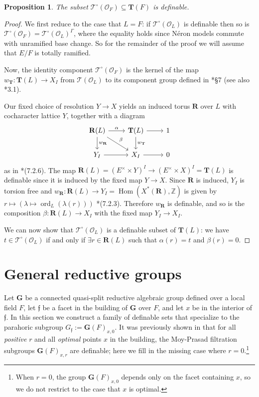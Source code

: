 \documentclass{amsart}
\newcommand{\Z}{{\mathbb Z}}
\newcommand{\ri}{\mathcal{O}}
\DeclareMathOperator{\ord}{ord}
\DeclareMathOperator{\Hom}{Hom}
\newcommand{\bG}{\mathbf{G}}
\newcommand{\bT}{\mathbf {T}}
\newcommand{\bR}{\mathbf{R}}
\newcommand{\ff}{{\mathfrak f}}
\newcommand{\Ner}[1]{\mathcal{#1}}
\newcommand{\NerC}[1]{\mathcal{#1}^\circ}
\theoremstyle{plain}
\newtheorem{prop}[thm]{Proposition}
\theoremstyle{definition}
\begin{document}
\begin{prop} \label{prop:NerCdefinable}
The subset $\NerC{T}(\ri_F) \subseteq \bT(F)$ is definable.
\end{prop}
\begin{proof}
We first reduce to the case that $L = F$: if $\NerC{T}(\ri_L)$ is definable then so is
$\NerC{T}(\ri_F) = \NerC{T}(\ri_L)^\Gamma$, where the equality holds since N\'eron models commute with unramified base change.
So for the remainder of the proof we will assume that $E/F$ is totally ramified.

Now, the identity component $\NerC{T}(\ri_F)$ is the kernel of the map $w_\bT : \bT(L) \to X_I$ from
$\Ner{T}(\ri_L)$ to its component group  defined in \cite{kottwitz:isocrystals-2}*{\S 7} (see also \cite{bitan}*{3.1}).

Our fixed choice of resolution $Y \to X$ yields an induced torus $\bR$ over $L$ with cocharacter lattice $Y$, together with a diagram
\[
\begin{tikzcd}
\bR(L) \rar{\alpha} \dar{w_{\bR}} \drar{\beta} & \bT(L) \rar \dar{w_{\bT}} & 1 \\
Y_I \rar & X_I \rar & 0
\end{tikzcd}
\]
as in \cite{kottwitz:isocrystals-2}*{(7.2.6)}.  The map $\bR(L) = (E^\times \times Y)^I \to (E^\times \times X)^I = \bT(L)$
is definable since it is induced by the fixed map $Y \to X$.  Since $\bR$ is induced,
$Y_I$ is torsion free and $w_\bR : \bR(L) \to Y_I = \Hom(X^\ast(\bR), \Z)$ is given by
$r \mapsto \left(\lambda \mapsto \ord_{L}(\lambda(r))\right)$ \cite{kottwitz:isocrystals-2}*{(7.2.3)}.
Therefore $w_\bR$ is definable, and so is the composition $\beta : \bR(L) \to X_I$ with the fixed map $Y_I \to X_I$.

We can now show that $\NerC{T}(\ri_L)$ is a definable subset of $\bT(L)$: we have $t \in \NerC{T}(\ri_L)$
if and only if $\exists r \in \bR(L)$ such that $\alpha(r) = t$ and $\beta(r) = 0$.
\end{proof}

\section{General reductive groups}
Let $\bG$ be a connected quasi-split reductive algebraic group defined over a local field $F$,
let $\ff$ be a facet in the building of $\bG$ over $F$, and let $x$ be in the interior of $\ff$. 
In this section we construct a family of definable sets that specialize to the parahoric subgroup ${G}_{\ff}:={\bG}(F)_{x, 0}$.
It was previously shown in \cite{CGH-2} that for all \emph{positive} $r$ and all \emph{optimal} points $x$ in the building,
the Moy-Prasad filtration subgroups ${\bG}(F)_{x, r}$ are definable; here we fill in the missing case where
$r=0$.\footnote{When $r=0$, the group ${\bG}(F)_{x,0}$ depends only on the facet containing $x$,
so we do not restrict to the case that $x$ is optimal.}
\end{document}
